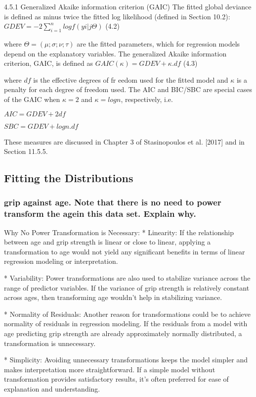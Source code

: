 4.5.1 Generalized Akaike information criterion (GAIC)
The fitted global deviance is defined as minus twice the fitted log likelihood (defined in Section 10.2):
$GDEV = -2 \sum^{n}_{i=1} log f(yi | j\Theta)$ (4.2)

where $\Theta = (\mu; \sigma; \nu; \tau )$ are the fitted parameters, which for regression models depend
on the explanatory variables. The generalized Akaike information criterion, GAIC, is
defined as $GAIC(\kappa) = GDEV + \kappa . df$ (4.3)

where $df$ is the effective degrees of fr
eedom used for the fitted model and $\kappa$ is a penalty
for each degree of freedom used. The AIC and BIC/SBC are special cases of the GAIC
when $\kappa = 2$ and $\kappa = log n$, respectively, i.e.

$AIC = GDEV + 2 df$

$SBC = GDEV + log n . df$

These measures are discussed in Chapter 3 of Stasinopoulos et al. [2017] and in Section 11.5.5.

\subsection{Fitting the Distributions}

\subsubsection{grip against age. Note that there is no need to power transform the agein this data set. Explain why.}

Why No Power Transformation is Necessary:
*    Linearity: If the relationship between age and grip strength is linear or close to linear, applying a transformation to age would not yield any significant benefits in terms of linear regression modeling or interpretation.
    
*    Variability: Power transformations are also used to stabilize variance across the range of predictor variables. If the variance of grip strength is relatively constant across ages, then transforming age wouldn't help in stabilizing variance.
    
*    Normality of Residuals: Another reason for transformations could be to achieve normality of residuals in regression modeling. If the residuals from a model with age predicting grip strength are already approximately normally distributed, a transformation is unnecessary.
    
*    Simplicity: Avoiding unnecessary transformations keeps the model simpler and makes interpretation more straightforward. If a simple model without transformation provides satisfactory results, it's often preferred for ease of explanation and understanding.

